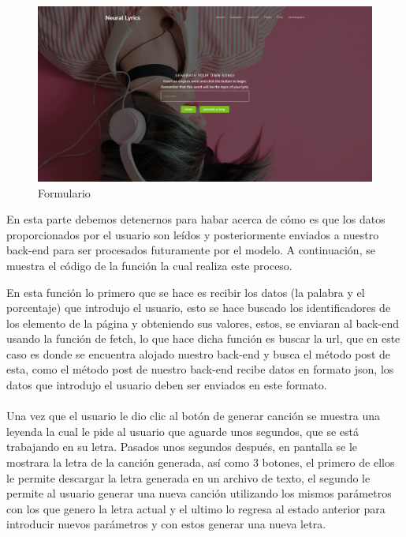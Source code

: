 \documentclass[12pt, a4paper, titlepage]{article}
\begin{document}
	\begin{figure}[H]
		\includegraphics[width=13.5cm]{./Imagenes/AplicacionWeb/pform.png}
		\centering 
		\caption{Formulario}
	\end{figure}
	En esta parte debemos detenernos para habar acerca de cómo es que los datos proporcionados por el usuario son leídos y posteriormente enviados a nuestro back-end para ser procesados futuramente por el modelo. A continuación, se muestra el código de la función la cual realiza este proceso.
	\begin{center}
		
	\end{center}
	En esta función lo primero que se hace es recibir los datos (la palabra y el porcentaje) que introdujo el usuario, esto se hace buscado los identificadores de los elemento de la página y obteniendo sus valores, estos, se enviaran al back-end usando la función de fetch, lo que hace dicha función es buscar la url, que en este caso es donde se encuentra alojado nuestro back-end y busca el método post de esta, como el método post de nuestro back-end recibe datos en formato json, los datos que introdujo el usuario deben ser enviados en este formato.\\\\
	Una vez que el usuario le dio clic al botón de generar canción se muestra una leyenda la cual le pide al usuario que aguarde unos segundos, que se está trabajando en su letra. Pasados unos segundos después, en pantalla se le mostrara la letra de la canción generada, así como 3 botones, el primero de ellos le permite descargar la letra generada en un archivo de texto, el segundo le permite al usuario generar una nueva canción utilizando los mismos parámetros con los que genero la letra actual y el ultimo lo regresa al estado anterior para introducir nuevos parámetros y con estos generar una nueva letra.
\end{document}
